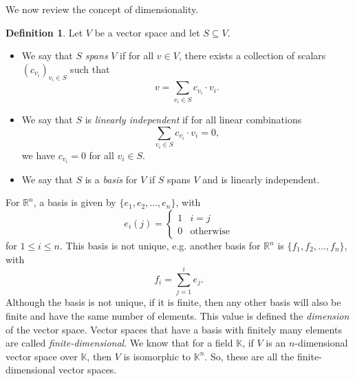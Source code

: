 \documentclass[a4paper, openany]{memoir}
\theoremstyle{definition}
\newtheorem{definition}{Definition}[section]
\theoremstyle{plain}
\begin{document}
    We now review the concept of dimensionality.
    \begin{definition}
        Let $V$ be a vector space and let $S \subseteq V$.
        \begin{itemize}
            \item We say that $S$ \emph{spans} $V$ if for all $v \in V$, there exists a collection of scalars $(c_{v_i})_{v_i \in S}$ such that 
            \[v = \sum_{v_i \in S} c_{v_i} \cdot v_i.\]
            \item We say that $S$ is \emph{linearly independent} if for all linear combinations
            \[\sum_{v_i \in S} c_{v_i} \cdot v_i = 0,\]
            we have $c_{v_i} = 0$ for all $v_i \in S$.
            \item We say that $S$ is a \emph{basis} for $V$ if $S$ spans $V$ and is linearly independent.
        \end{itemize}
    \end{definition}
    \noindent For $\mathbb{R}^n$, a basis is given by $\{e_1, e_2, \dots, e_n\}$,
    with 
    \[e_i(j) = \begin{cases}
        1 & i = j \\
        0 & \textrm{otherwise}
    \end{cases}\]
    for $1 \leq i \leq n$. This basis is not unique, e.g. another basis for $\mathbb{R}^n$ is $\{f_1, f_2, \dots, f_n\}$, with
    \[f_i = \sum_{j=1}^i e_j.\]
    Although the basis is not unique, if it is finite, then any other basis will also be finite and have the same number of elements. This value is defined the \emph{dimension} of the vector space. Vector spaces that have a basis with finitely many elements are called \emph{finite-dimensional}. We know that for a field $\mathbb{K}$, if $V$ is an $n$-dimensional vector space over $\mathbb{K}$, then $V$ is isomorphic to $\mathbb{K}^n$. So, these are all the finite-dimensional vector spaces.
\end{document}
